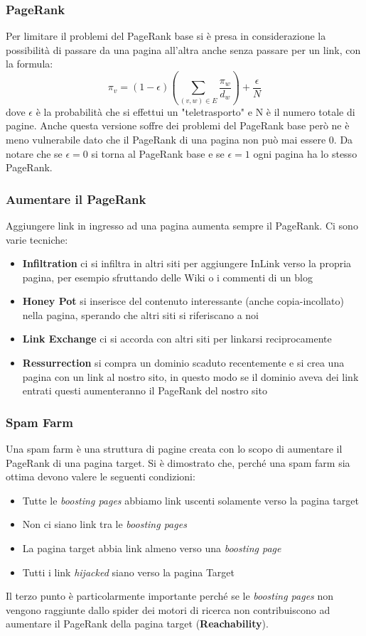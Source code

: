 \subsubsection{PageRank} 
Per limitare il problemi del PageRank base si è presa in considerazione la possibilità di passare da una pagina all'altra anche senza passare per un link, con la formula:
$$ \pi_v = (1-\epsilon) ( \sum_{(v,w) \in E} \frac{\pi_w}{d_w} ) + \frac{\epsilon}{N} $$
dove $ \epsilon $ è la probabilità che si effettui un "teletrasporto" e N è il numero totale di pagine.
Anche questa versione soffre dei problemi del PageRank base però ne è meno vulnerabile dato che il PageRank di una pagina non può mai essere 0.
Da notare che se $\epsilon=0$ si torna al PageRank base e se $\epsilon=1$ ogni pagina ha lo stesso PageRank.

\subsubsection{Aumentare il PageRank}

Aggiungere link in ingresso ad una pagina aumenta sempre il PageRank.
Ci sono varie tecniche:
\begin{itemize}
\item \textbf{Infiltration} ci si infiltra in altri siti per aggiungere InLink verso la propria pagina, per esempio sfruttando delle Wiki o i commenti di un blog
\item \textbf{Honey Pot} si inserisce del contenuto interessante (anche copia-incollato) nella pagina, sperando che altri siti si riferiscano a noi
\item \textbf{Link Exchange} ci si accorda con altri siti per linkarsi reciprocamente
\item \textbf{Ressurrection} si compra un dominio scaduto recentemente e si crea una pagina con un link al nostro sito, in questo modo se il dominio aveva dei link entrati questi aumenteranno il PageRank del nostro sito
\end{itemize}

\subsubsection{Spam Farm}
Una spam farm è una struttura di pagine creata con lo scopo di aumentare il PageRank di una pagina target.
Si è dimostrato che, perché una spam farm sia ottima devono valere le seguenti condizioni:
\begin{itemize}
\item Tutte le \textit{boosting pages} abbiamo link uscenti solamente verso la pagina target
\item Non ci siano link tra le \textit{boosting pages}
\item La pagina target abbia link almeno verso una \textit{boosting page}
\item Tutti i link \textit{hijacked} siano verso la pagina Target
\end{itemize}
Il terzo punto è particolarmente importante perché se le \textit{boosting pages} non vengono raggiunte dallo spider dei motori di ricerca non contribuiscono ad aumentare il PageRank della pagina target (\textbf{Reachability}).

